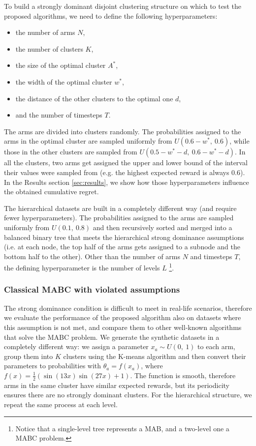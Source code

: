 To build a strongly dominant disjoint clustering structure on which to test the proposed algorithms, we need to define the following hyperparameters:

\begin{itemize}
  \item the number of arms $N$,
  \item the number of clusters $K$,
  \item the size of the optimal cluster $A^*$,
  \item the width of the optimal cluster $w^*$,
  \item the distance of the other clusters to the optimal one $d$,
  \item and the number of timesteps $T$.
\end{itemize}

The arms are divided into clusters randomly. The probabilities assigned to the arms in the optimal cluster are sampled uniformly from $U(0.6 - w^*,\ 0.6)$, while those in the other clusters are sampled from $U(0.5 - w^* - d,\ 0.6 - w^* - d)$. In all the clusters, two arms get assigned the upper and lower bound of the interval their values were sampled from (e.g. the highest expected reward is always 0.6). In the Results section \ref{sec:results}, we show how those hyperparameters influence the obtained cumulative regret. 

The hierarchical datasets are built in a completely different way (and require fewer hyperparameters). The probabilities assigned to the arms are sampled uniformly from $U(0.1,\ 0.8)$ and then recursively sorted and merged into a balanced binary tree that meets the hierarchical strong dominance assumptions (i.e. at each node, the top half of the arms gets assigned to a subnode and the bottom half to the other). Other than the number of arms $N$ and timesteps $T$, the defining hyperparameter is the number of levels $L$ \footnote{Notice that a single-level tree represents a MAB, and a two-level one a MABC problem.}.

\subsubsection{Classical MABC with violated assumptions}

The strong dominance condition is difficult to meet in real-life scenarios, therefore we evaluate the performance of the proposed algorithm also on datasets where this assumption is not met, and compare them to other well-known algorithms that solve the MABC problem. We generate the synthetic datasets in a completely different way: we assign a parameter $x_a \sim U(0,\ 1)$ to each arm, group them into $K$ clusters using the K-means algorithm and then convert their parameters to probabilities with $\theta_a = f(x_a)$, where $f(x) = \frac{1}{2} (\sin{(13x)} \sin{(27x)} + 1)$. The function is smooth, therefore arms in the same cluster have similar expected rewards, but its periodicity ensures there are no strongly dominant clusters. For the hierarchical structure, we repeat the same process at each level.

